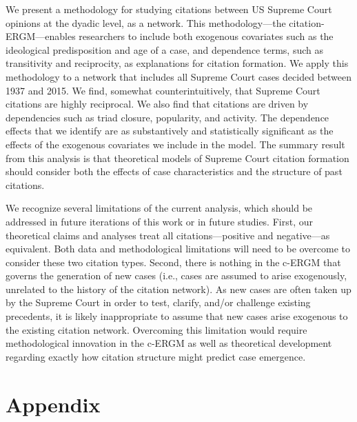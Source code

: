 \documentclass[headsepline=true, abstracton]{scrartcl}
\begin{document}
We present a methodology for studying citations between US Supreme Court opinions at the dyadic level, as a network. This methodology---the citation-ERGM---enables researchers to include both exogenous covariates such as the ideological predisposition and age of a case, and dependence terms, such as transitivity and reciprocity, as explanations for citation formation. We apply this methodology to a network that includes all Supreme Court cases decided between 1937 and 2015. We find, somewhat counterintuitively, that Supreme Court citations are highly reciprocal. We also find that citations are driven by dependencies such as triad closure, popularity, and activity. The dependence effects that we identify are as substantively and statistically significant as the effects of the exogenous covariates we include in the model. The summary result from this analysis is that theoretical models of Supreme Court citation formation should consider both the effects of case characteristics and the structure of past citations. 

We recognize several limitations of the current analysis, which should be addressed in future iterations of this work or in future studies. First, our theoretical claims and analyses treat all citations---positive and negative---as equivalent. Both data and methodological limitations will need to be overcome to consider these two citation types. Second, there is nothing in the c-ERGM that governs the generation of new cases (i.e., cases are assumed to arise exogenously, unrelated to the history of the citation network). As new cases are often taken up by the Supreme Court in order to test, clarify, and/or challenge existing precedents, it is likely inappropriate to assume that new cases arise exogenous to the existing citation network. Overcoming this limitation would require methodological innovation in the c-ERGM as well as theoretical development regarding exactly how citation structure might predict case emergence. 


\section{Appendix}
\end{document}
